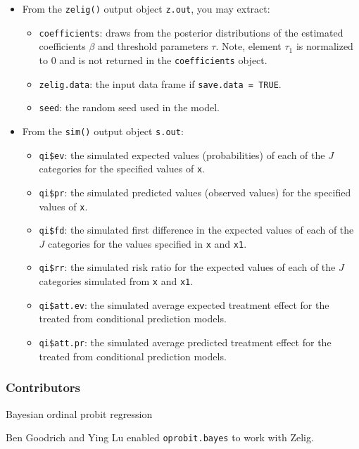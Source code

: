 \begin{itemize}
\item From the \texttt{zelig()} output object \texttt{z.out}, you may extract:

\begin{itemize}
\item \texttt{coefficients}: draws from the posterior distributions
of the estimated coefficients $\beta$ and threshold parameters $\tau$.
Note, element $\tau_1$ is normalized to 0 and is not returned in the 
\texttt{coefficients} object.

   \item {\tt zelig.data}: the input data frame if {\tt save.data = TRUE}.  
\item \texttt{seed}: the random seed used in the model.

\end{itemize}

\item From the \texttt{sim()} output object \texttt{s.out}:

\begin{itemize}
\item \texttt{qi\$ev}: the simulated expected values (probabilities) of 
each of the $J$ categories for the specified values of \texttt{x}.

\item \texttt{qi\$pr}: the simulated predicted values (observed values)
 for the specified values of \texttt{x}.

\item \texttt{qi\$fd}: the simulated first difference in the expected
values of each of the $J$ categories for the values specified in 
\texttt{x} and \texttt{x1}.

\item \texttt{qi\$rr}: the simulated risk ratio for the 
expected values of each of the $J$ categories simulated 
from \texttt{x} and \texttt{x1}.

\item \texttt{qi\$att.ev}: the simulated average expected treatment effect
for the treated from conditional prediction models.

\item \texttt{qi\$att.pr}: the simulated average predicted treatment effect
for the treated from conditional prediction models.
\end{itemize}
\end{itemize}

\subsubsection{Contributors}
Bayesian ordinal probit regression 

\noindent Ben Goodrich and Ying Lu enabled \texttt{oprobit.bayes} to work with Zelig.


